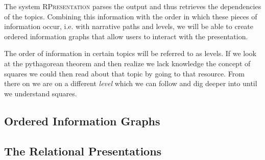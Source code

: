 \documentclass[twoside, 12pt]{article}
\newcommand{\sys}{\textsc{RPresentation}\xspace}
\begin{document}
\begin{figure}
\vspace{-50pt}
\end{figure}


The system \sys parses the output and thus retrieves the dependencies of the topics. Combining this information with the order in which these pieces of information occur, i.e. with narrative paths and levels, we will be able to create ordered information graphs that allow users to interact with the presentation. 

The order of information in certain topics will be referred to as levels. If we look at the pythagorean theorem and then realize we lack knowledge the concept of squares we could then read about that topic by going to that resource. From there on we are on a different \textit{level} which we can follow and dig deeper into until we understand squares.\\


\subsection{Ordered Information Graphs}
\label{sec:orderedInfoGraphs}








\subsection{The Relational Presentations}
\label{sec:RelationalPresentations}
\end{document}
